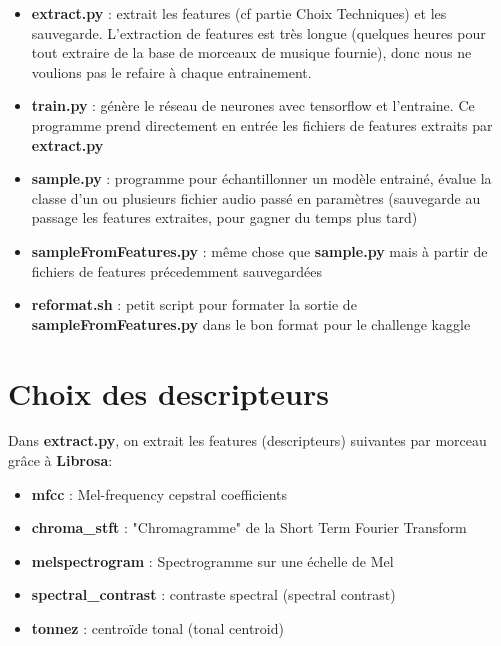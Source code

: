 \documentclass{article}
\begin{document}
\begin{itemize}
  
\item \textbf{extract.py} : extrait les features (cf partie Choix Techniques) et les sauvegarde. L'extraction de features est très longue (quelques heures pour tout extraire de la base de morceaux de musique fournie), donc nous ne voulions pas le refaire à chaque entrainement.
  
\item \textbf{train.py} : génère le réseau de neurones avec tensorflow et l'entraine. Ce programme prend directement en entrée les fichiers de features extraits par \textbf{extract.py}

\item \textbf{sample.py} : programme pour échantillonner un modèle entrainé, évalue la classe d'un ou plusieurs fichier audio passé en paramètres (sauvegarde au passage les features extraites, pour gagner du temps plus tard)

\item \textbf{sampleFromFeatures.py} : même chose que \textbf{sample.py} mais à partir de fichiers de features précedemment sauvegardées

\item \textbf{reformat.sh} : petit script pour formater la sortie de \textbf{sampleFromFeatures.py} dans le bon format pour le challenge kaggle
  
\end{itemize}

\section*{Choix des descripteurs}

Dans \textbf{extract.py}, on extrait les features (descripteurs) suivantes par morceau grâce à \textbf{Librosa}:

\begin{itemize}

  \item \textbf{mfcc} : Mel-frequency cepstral coefficients 
  \item \textbf{chroma\_stft} : "Chromagramme" de la  Short Term Fourier Transform
  \item \textbf{melspectrogram} : Spectrogramme sur une échelle de Mel
  \item \textbf{spectral\_contrast} : contraste spectral (spectral contrast)
  \item \textbf{tonnez} : centroïde tonal (tonal centroid)
    
\end{itemize}
\end{document}
